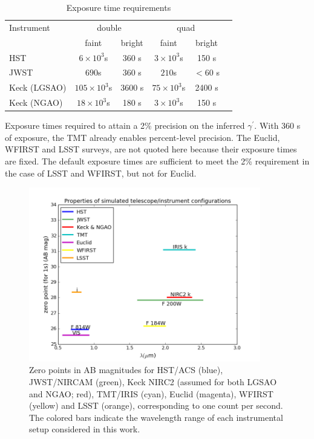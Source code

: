 \documentclass[a4paper,11pt]{article}
\begin{document}
\begin{table}\footnotesize
\begin{center}
\caption{Exposure time requirements}
\begin{tabular}{lccccc|}
\hline \hline
Instrument & \multicolumn{2}{c}{double} & \multicolumn{2}{c}{quad} \\
  & faint  & bright &  faint  &  bright \\
\hline
  HST   & $6\times10^3$s & 360 s  & $3\times10^3$s & 150 s \\
  JWST   & $690$s & 360 s  & $210$s & $<$60 s \\
  Keck (LGSAO)   & $105\times10^3$s & 3600 s  & $75\times10^3$s & 2400 s \\
  Keck (NGAO)   & $18\times10^3$s & 180 s  & $3\times10^3$s & 150 s \\
\hline
\hline
\end{tabular}
\begin{tablenotes}
\item
Exposure times required to attain a 2\% precision on the inferred $\gamma^\prime.$
 With 360 s of exposure, the TMT already enables percent-level precision.
 The Euclid, WFIRST and LSST surveys, are not quoted here because their exposure times are fixed. The default exposure times are sufficient to meet the 2\% requirement in the case of LSST and WFIRST, but not for Euclid.\\
\end{tablenotes}
\label{tab:exptimes}
\end{center}
\end{table}

\begin{figure}
\begin{center}
\includegraphics[width=0.9\textwidth]{figures/wavelength_zp.png}
\end{center}
\caption{Zero points in AB magnitudes for HST/ACS (blue), JWST/NIRCAM (green), Keck NIRC2  (assumed for both LGSAO and NGAO; red), TMT/IRIS (cyan), Euclid (magenta), WFIRST (yellow) and LSST (orange), corresponding to one count per second. The colored bars indicate the wavelength range of each instrumental setup considered in this work.}
\label{fig:zp_wavelength}
\end{figure}
\end{document}

